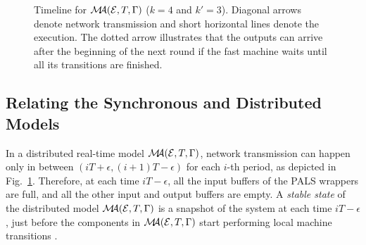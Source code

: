 \begin{figure}
\begin{center}
\caption{Timeline for $\mathcal{M}\!\!\mathcal{A}(\mathcal{E}, T, \Gamma)$ ($k=4$ and $k' = 3$).
Diagonal arrows denote network transmission and short horizontal lines denote the execution.
The dotted arrow illustrates that the outputs can arrive after the beginning of the next round 
if the fast machine waits until all its transitions are finished.
\label{fig:mr-timeline}}
\end{center}
\end{figure} 



\subsection{Relating the Synchronous and Distributed Models}

In a distributed real-time model $\mathcal{M}\!\!\mathcal{A}(\mathcal{E}, T, \Gamma)$,
network transmission can happen only in between  $(iT+\epsilon, (i+1)T-\epsilon)$
for each $i$-th period, as depicted in Fig.~\ref{fig:mr-timeline}.
Therefore, at each time $iT - \epsilon$, all the input buffers of the PALS wrappers are full, 
and all the other input and output buffers are empty.
A \emph{stable state} of the distributed model $\mathcal{M}\!\!\mathcal{A}(\mathcal{E}, T, \Gamma)$
is a snapshot of the system at each time $iT - \epsilon$,
just before the components in $\mathcal{M}\!\!\mathcal{A}(\mathcal{E}, T, \Gamma)$ 
start performing local machine transitions \cite{pals-tcs}.



